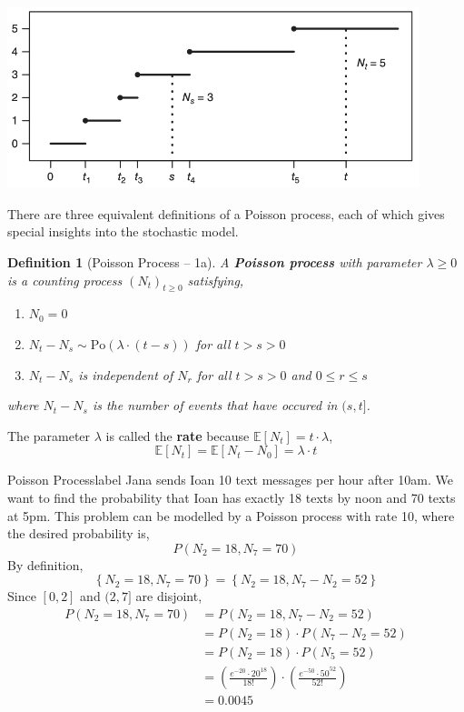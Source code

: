 \documentclass{tufte-handout}
\newtheorem{defn}[thm]{Definition}
\begin{document}
  \begin{marginfigure}
    \begin{center}
      \includegraphics[width=0.9\textwidth]{fig-18.png}
      \caption{Counting process.}
    \end{center}
  \end{marginfigure}

There are three equivalent definitions of a Poisson process, each of which gives special insights into the stochastic model. 

\begin{defn}[Poisson Process -- 1a]
  A \textbf{Poisson process} with parameter $\lambda \geq 0$ is a counting process $(N_t)_{t \geq 0}$ satisfying,
  \begin{enumerate}
    \item $N_0 = 0$
    \item $N_t - N_s \sim \text{Po}(\lambda \cdot (t-s))$ for all $t > s > 0$
    \item $N_t - N_s$ is independent of $N_r$ for all $t > s> 0$ and $0 \leq r \leq s$
  \end{enumerate}
  \noindent where $N_t - N_s$ is the number of events that have occured in $(s, t]$.
\end{defn}

\begin{marginfigure}
  The parameter $\lambda$ is called the \textbf{rate} because $\mathbb{E}[N_t] = t \cdot \lambda$,
  \[\mathbb{E}[N_t] = \mathbb{E}[N_t - N_0] = \lambda \cdot t\]
\end{marginfigure}

\begin{ex}{Poisson Process}{label}
  Jana sends Ioan 10 text messages per hour after 10am. We want to find the probability that Ioan has exactly 18 texts by noon and 70 texts at 5pm. This problem can be modelled by a Poisson process with rate 10, where the desired probability is,
  \[P(N_2 = 18, N_7 = 70)\]
  By definition,
  \[\left\{N_{2}=18, N_{7}=70\right\}=\left\{N_{2}=18, N_{7}-N_{2}=52\right\}\]
  Since $[0,2]$ and $(2, 7]$ are disjoint,
  \begin{align*}
  P\left(N_{2}=18, N_{7}=70\right) &=P\left(N_{2}=18, N_{7}-N_{2}=52\right) \\
  &=P\left(N_{2}=18\right) \cdot P\left(N_{7}-N_{2}=52\right) \\
  &=P\left(N_{2}=18\right) \cdot P\left(N_{5}=52\right) \\
  &=\left(\frac{e^{-20} \cdot 20^{18}}{18 !}\right) \cdot \left(\frac{e^{-50} \cdot 50^{52}}{52 !}\right) \\
  &=0.0045
  \end{align*}
\end{ex}
\end{document}
